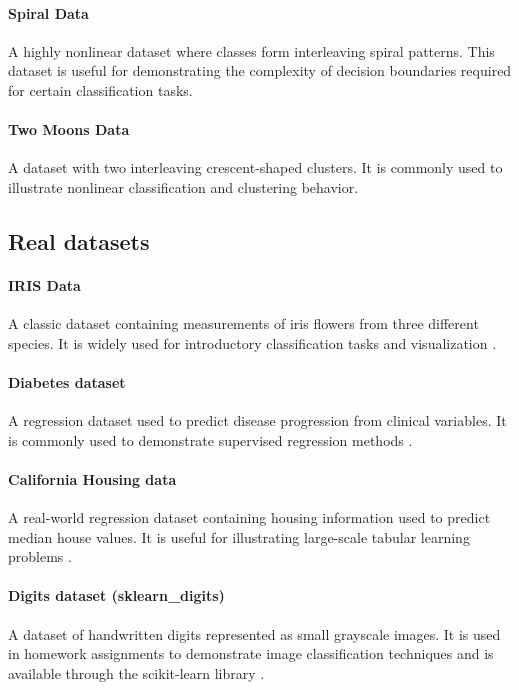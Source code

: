 \documentclass{article}
\begin{document}
\paragraph{Spiral Data}
A highly nonlinear dataset where classes form interleaving spiral patterns. This dataset is useful for demonstrating the complexity of decision boundaries required for certain classification tasks.

\paragraph{Two Moons Data}
A dataset with two interleaving crescent-shaped clusters. It is commonly used to illustrate nonlinear classification and clustering behavior.

\subsection{Real datasets}

\paragraph{IRIS Data}
A classic dataset containing measurements of iris flowers from three different species. It is widely used for introductory classification tasks and visualization \cite{fisher1936iris}.

\paragraph{Diabetes dataset}
A regression dataset used to predict disease progression from clinical variables. It is commonly used to demonstrate supervised regression methods \cite{efron2004least}.

\paragraph{California Housing data}
A real-world regression dataset containing housing information used to predict median house values. It is useful for illustrating large-scale tabular learning problems \cite{pace1997sparse}.

\paragraph{Digits dataset (sklearn\_digits)}
A dataset of handwritten digits represented as small grayscale images. It is used in homework assignments to demonstrate image classification techniques and is available through the scikit-learn library \cite{scikit-learn}.
\end{document}
